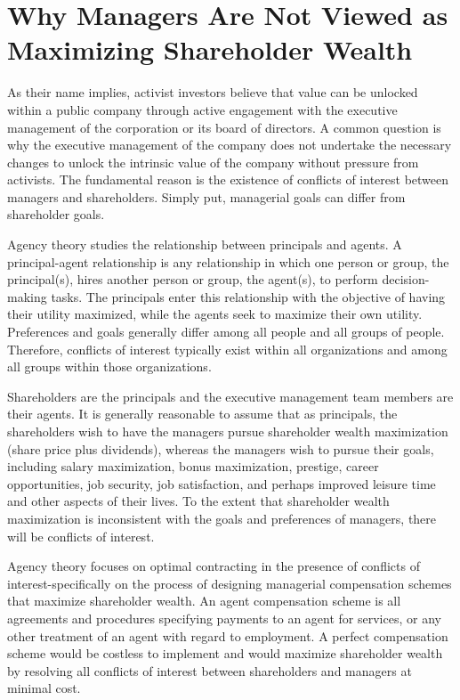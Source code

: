 \documentclass[11pt]{article}
\begin{document}
\section*{Why Managers Are Not Viewed as Maximizing Shareholder Wealth}
As their name implies, activist investors believe that value can be unlocked within a public company through active engagement with the executive management of the corporation or its board of directors. A common question is why the executive management of the company does not undertake the necessary changes to unlock the intrinsic value of the company without pressure from activists. The fundamental reason is the existence of conflicts of interest between managers and shareholders. Simply put, managerial goals can differ from shareholder goals.

Agency theory studies the relationship between principals and agents. A principal-agent relationship is any relationship in which one person or group, the principal(s), hires another person or group, the agent(s), to perform decision-making tasks. The principals enter this relationship with the objective of having their utility maximized, while the agents seek to maximize their own utility. Preferences and goals generally differ among all people and all groups of people. Therefore, conflicts of interest typically exist within all organizations and among all groups within those organizations.

Shareholders are the principals and the executive management team members are their agents. It is generally reasonable to assume that as principals, the shareholders wish to have the managers pursue shareholder wealth maximization (share price plus dividends), whereas the managers wish to pursue their goals, including salary maximization, bonus maximization, prestige, career opportunities, job security, job satisfaction, and perhaps improved leisure time and other aspects of their lives. To the extent that shareholder wealth maximization is inconsistent with the goals and preferences of managers, there will be conflicts of interest.

Agency theory focuses on optimal contracting in the presence of conflicts of interest-specifically on the process of designing managerial compensation schemes that maximize shareholder wealth. An agent compensation scheme is all agreements and procedures specifying payments to an agent for services, or any other treatment of an agent with regard to employment. A perfect compensation scheme would be costless to implement and would maximize shareholder wealth by resolving all conflicts of interest between shareholders and managers at minimal cost.
\end{document}
